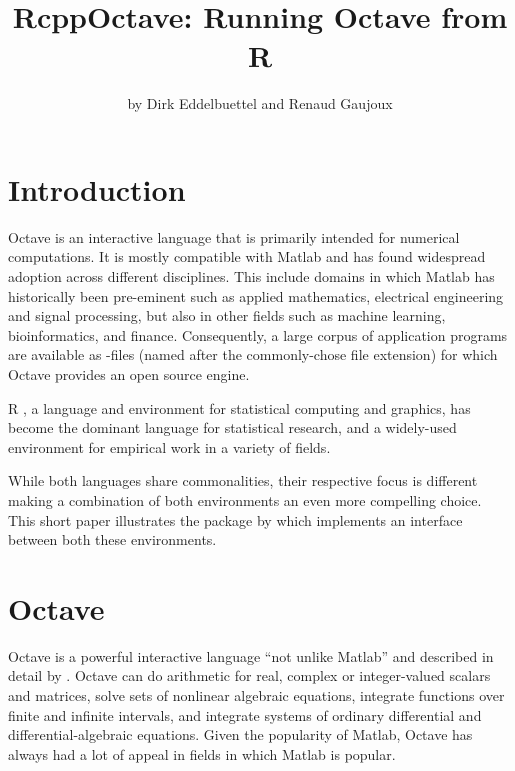 


\title{RcppOctave: Running Octave from R}
\author{by Dirk Eddelbuettel and Renaud Gaujoux}

\maketitle


\section{Introduction}

Octave \citep{Octave:2012} is an interactive language that is primarily
intended for numerical computations. It is mostly compatible with Matlab
\citep{MATLAB:2010} and has found widespread adoption across different
disciplines. This include domains in which Matlab has historically been
pre-eminent such as applied mathematics, electrical engineering and signal
processing, but also in other fields such as machine learning,
bioinformatics, and finance.  Consequently, a large corpus of application
programs are available as -files (named after the commonly-chose
file extension) for which Octave provides an open source engine.

R \citep{R:2012}, a language and environment for statistical
computing and graphics, has become the dominant language for statistical
research, and a widely-used environment for empirical work in a variety of
fields.

While both languages share commonalities, their respective focus is different
making a combination of both environments an even more compelling choice.
This short paper illustrates the  package by
\cite{CRAN:RcppOctave} which implements an interface between both these
environments.

\section{Octave}

Octave \citep{Octave:2012} is a powerful interactive language ``not unlike
Matlab'' and described in detail by \citet{Eaton:2008}. Octave can do
arithmetic for real, complex or integer-valued scalars and matrices, solve
sets of nonlinear algebraic equations, integrate functions over finite and
infinite intervals, and integrate systems of ordinary differential and
differential-algebraic equations.  Given the popularity of Matlab, Octave has
always had a lot of appeal in fields in which Matlab is popular.


